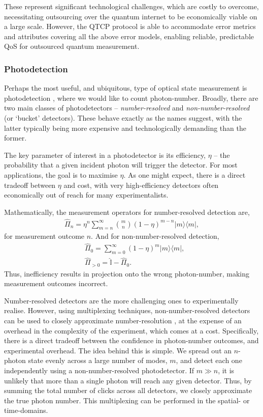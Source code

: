 \documentclass[aps,rmp,twocolumn,amsmath,amssymb,nofootinbib,superscriptaddress,longbibliography,floatfix]{revtex4-1}
\newcommand{\bra}[1]{\langle#1|}
\newcommand{\ket}[1]{|#1\rangle}
\begin{document}
These represent significant technological challenges, which are costly to overcome, necessitating outsourcing over the quantum internet to be economically viable on a large scale. However, the QTCP protocol is able to accommodate error metrics and attributes covering all the above error models, enabling reliable, predictable QoS for outsourced quantum measurement.

%
%

\subsubsection{Photodetection}

Perhaps the most useful, and ubiquitous, type of optical state measurement is photodetection \cite{RohdePDReview}, where we would like to count photon-number. Broadly, there are two main classes of photodetectors -- \emph{number-resolved} and \emph{non-number-resolved} (or `bucket' detectors). These behave exactly as the names suggest, with the latter typically being more expensive and technologically demanding than the former.

The key parameter of interest in a photodetector is its efficiency, $\eta$ -- the probability that a given incident photon will trigger the detector. For most applications, the goal is to maximise $\eta$. As one might expect, there is a direct tradeoff between $\eta$ and cost, with very high-efficiency detectors often economically out of reach for many experimentalists.

Mathematically, the measurement operators for number-resolved detection are,
\begin{align}
\hat\Pi_n = \eta^{n} \sum_{m=n}^\infty \binom{m}{n} (1-\eta)^{m-n} \ket{m}\bra{m},
\end{align}
for measurement outcome $n$. And for non-number-resolved detection,
\begin{align}
&\hat\Pi_0 = \sum_{m=0}^\infty (1-\eta)^{m} \ket{m}\bra{m}, \nonumber \\
&\hat\Pi_{>0} = \mathbb{\hat{I}} - \hat\Pi_0.
\end{align}
Thus, inefficiency results in projection onto the wrong photon-number, making measurement outcomes incorrect.

Number-resolved detectors are the more challenging ones to experimentally realise. However, using multiplexing techniques, non-number-resolved detectors can be used to closely approximate number-resolution \cite{bib:Fitch03, bib:Banaszek03, bib:Achilles04, bib:RohdeCompDet07}, at the expense of an overhead in the complexity of the experiment, which comes at a cost. Specifically, there is a direct tradeoff between the confidence in photon-number outcomes, and experimental overhead. The idea behind this is simple. We spread out an $n$-photon state evenly across a large number of modes, $m$, and detect each one independently using a non-number-resolved photodetector. If \mbox{$m\gg n$}, it is unlikely that more than a single photon will reach any given detector. Thus, by summing the total number of clicks across all detectors, we closely approximate the true photon number. This multiplexing can be performed in the spatial- or time-domains.
\end{document}
